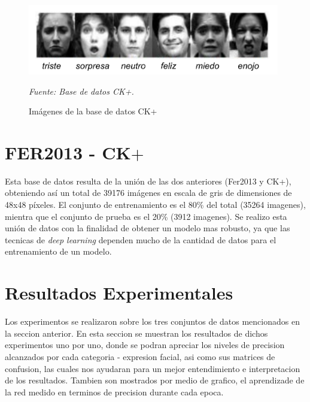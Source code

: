 \begin{figure}[H]
		\centering
		\includegraphics[width=110mm]{Imagenes/imagenes_ck+.pdf}
		\caption{Imágenes de la base de datos CK+}
		\vspace{0.15cm}
		\textit{Fuente: Base de datos CK+.}
		\label{fig:imagenes_ck+}
\end{figure}


\section{FER2013 - CK$+$}
Esta base de datos resulta de la unión de las dos anteriores (Fer2013 y CK+), obteniendo así un total de 39176 imágenes en escala de gris de dimensiones de 48x48 píxeles. El conjunto de entrenamiento es el 80\% del total (35264 imagenes), mientra que el conjunto de prueba es el 20\% (3912 imagenes). Se realizo esta unión de datos con la finalidad de obtener un modelo mas robusto, ya que las tecnicas de \textit{deep learning} dependen mucho de la cantidad de datos para el entrenamiento de un modelo.

\section{Resultados Experimentales}
\label{sec:experiment}

Los experimentos se realizaron sobre los tres conjuntos de datos mencionados en la seccion anterior. En esta seccion se muestran los resultados de dichos experimentos uno por uno, donde se podran apreciar los niveles de precision alcanzados por cada categoria - expresion facial, asi como sus matrices de confusion, las cuales nos ayudaran para un mejor entendimiento e interpretacion de los resultados. Tambien son mostrados por medio de grafico, el aprendizade de la red medido en terminos de precision durante cada epoca.

